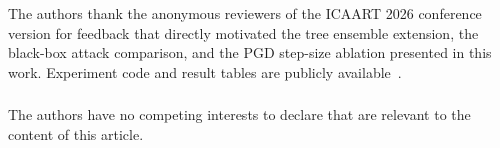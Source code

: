 \documentclass[runningheads]{llncs}
\begin{document}
\begin{credits}
\subsubsection{\ackname}
The authors thank the anonymous reviewers of the ICAART 2026 conference version
for feedback that directly motivated the tree ensemble extension, the black-box
attack comparison, and the PGD step-size ablation presented in this work.
Experiment code and result tables are publicly available~\cite{khawarey2026code}.

\subsubsection{\discintname}
The authors have no competing interests to declare that are relevant to the
content of this article.
\end{credits}



\end{document}
